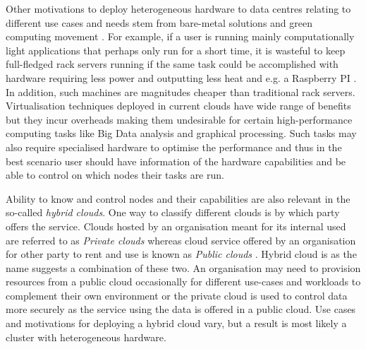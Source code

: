 Other motivations to deploy heterogeneous hardware to data centres relating to different use cases and needs stem from bare-metal solutions and green computing movement \cite{Kurp2008}. For example, if a user is running mainly computationally light applications that perhaps only run for a short time, it is wasteful to keep full-fledged rack servers running if the same task could be accomplished with hardware requiring less power and outputting less heat and e.g. a Raspberry PI \cite{raspberry}. In addition, such machines are magnitudes cheaper than traditional rack servers. Virtualisation techniques deployed in current clouds have wide range of benefits but they incur overheads making them undesirable for certain high-performance computing tasks like Big Data analysis and graphical processing. Such tasks may also require specialised hardware to optimise the performance and thus in the best scenario user should have information of the hardware capabilities and be able to control on which nodes their tasks are run.

Ability to know and control nodes and their capabilities are also relevant in the so-called \textit{hybrid clouds}. One way to classify different clouds is by which party offers the service. Clouds hosted by an organisation meant for its internal used are referred to as \textit{Private clouds} whereas cloud service offered by an organisation for other party to rent and use is known as \textit{Public clouds} \cite{cloudcomputingconcepts}. Hybrid cloud is as the name suggests a combination of these two. An organisation may need to provision resources from a public cloud occasionally for different use-cases and workloads to complement their own environment or the private cloud is used to control data more securely as the service using the data is offered in a public cloud. Use cases and motivations for deploying a hybrid cloud vary, but a result is most likely a cluster with heterogeneous hardware.


	
